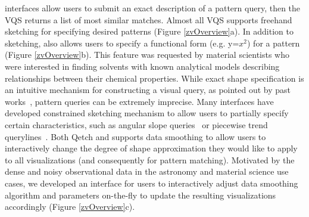  interfaces allow users to submit an exact description of a pattern query, then the VQS returns a list of most similar matches. Almost all VQS supports freehand sketching for specifying desired patterns (Figure \ref{zvOverview}a). In addition to sketching, \zv also allows users to specify a functional form (e.g. y=$x^2$) for a pattern (Figure \ref{zvOverview}b). This feature was requested by material scientists who were interested in finding solvents with known analytical models describing relationships between their chemical properties.
 While exact shape specification is an intuitive mechanism for constructing a visual query, as pointed out by past works~\cite{correll2016semantics,Holz2009}, pattern queries can be extremely imprecise. Many interfaces have developed constrained sketching mechanism to allow users to partially specify certain characteristics, such as angular slope queries~\cite{Hochheiser2004} or piecewise trend querylines~\cite{ryall2005querylines}. Both Qetch and \zv supports data smoothing to allow users to interactively change the degree of shape approximation they would like to apply to all visualizations (and consequently for pattern matching). Motivated by the dense and noisy observational data in the astronomy and material science use cases, we developed an interface for users to interactively adjust data smoothing algorithm and parameters on-the-fly to update the resulting visualizations accordingly (Figure \ref{zvOverview}c).


